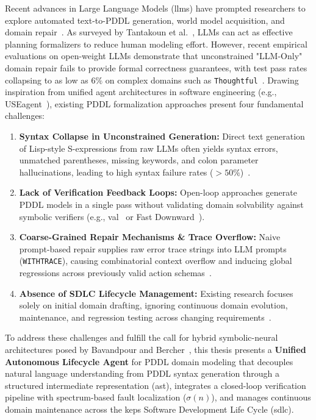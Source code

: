 Recent advances in Large Language Models (\gls{llm}s) have prompted researchers to explore automated text-to-PDDL generation, world model acquisition, and domain repair~\cite{oswald2024,guan2023,tantakoun2025,bavandpour2026llmonly}. As surveyed by Tantakoun et al.~\cite{tantakoun2025}, LLMs can act as effective planning formalizers to reduce human modeling effort. However, recent empirical evaluations on open-weight LLMs demonstrate that unconstrained "LLM-Only" domain repair fails to provide formal correctness guarantees, with test pass rates collapsing to as low as $6\%$ on complex domains such as \texttt{Thoughtful}~\cite{bavandpour2026llmonly}. Drawing inspiration from unified agent architectures in software engineering (e.g., USEagent~\cite{applis2026useagent}), existing PDDL formalization approaches present four fundamental challenges:
\begin{enumerate}
    \item \textbf{Syntax Collapse in Unconstrained Generation:} Direct text generation of Lisp-style S-expressions from raw LLMs often yields syntax errors, unmatched parentheses, missing keywords, and colon parameter hallucinations, leading to high syntax failure rates ($>50\%$)~\cite{oswald2024}.
    \item \textbf{Lack of Verification Feedback Loops:} Open-loop approaches generate PDDL models in a single pass without validating domain solvability against symbolic verifiers (e.g., \gls{val}~\cite{howey2004} or Fast Downward~\cite{helmert2006}).
    \item \textbf{Coarse-Grained Repair Mechanisms \& Trace Overflow:} Naive prompt-based repair supplies raw error trace strings into LLM prompts (\texttt{WITHTRACE}), causing combinatorial context overflow and inducing global regressions across previously valid action schemas~\cite{bavandpour2026llmonly}.
    \item \textbf{Absence of SDLC Lifecycle Management:} Existing research focuses solely on initial domain drafting, ignoring continuous domain evolution, maintenance, and regression testing across changing requirements~\cite{georgievski2023}.
\end{enumerate}

To address these challenges and fulfill the call for hybrid symbolic-neural architectures posed by Bavandpour and Bercher~\cite{bavandpour2026llmonly}, this thesis presents a \textbf{Unified Autonomous Lifecycle Agent} for PDDL domain modeling that decouples natural language understanding from PDDL syntax generation through a structured intermediate representation (\gls{ast}), integrates a closed-loop verification pipeline with spectrum-based fault localization ($\sigma(n)$), and manages continuous domain maintenance across the \gls{keps} Software Development Life Cycle (\gls{sdlc}).


